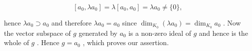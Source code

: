 \[
\left[ a _ {0}, \lambda a _ {0} \right] = \lambda \left[ a _ {0}, a _ {0} \right] = \lambda a _ {0} \neq \{0 \},
\]

hence \(\lambda a_0 \supset a_0\) and therefore \(\lambda a_0 = a_0\) since \(\dim_{K_0}(\lambda a_0) = \dim_{K_0}a_0\) . Now the vector subspace of \(g\) generated by \(a_0\) is a non-zero ideal of \(g\) and hence is the whole of \(g\) . Hence \(g = a_0\) , which proves our assertion.

